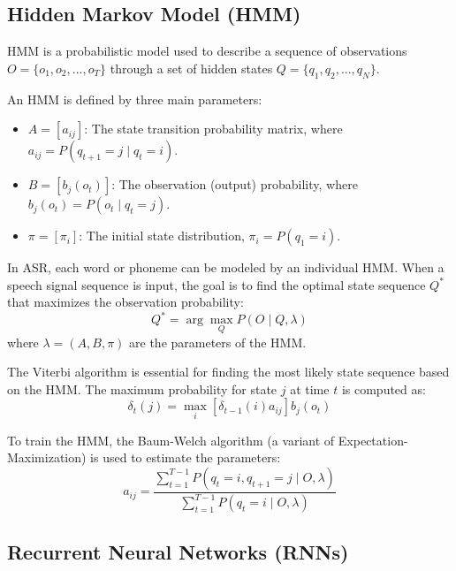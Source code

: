\documentclass[conference]{IEEEtran}
\begin{document}
\subsection{Hidden Markov Model (HMM)}
HMM is a probabilistic model used to describe a sequence of observations $O = \{o_1, o_2, ..., o_T\}$ through a set of hidden states $Q = \{q_1, q_2, ..., q_N\}$.

An HMM is defined by three main parameters:
\begin{itemize}
    \item $A = [a_{ij}]$: The state transition probability matrix, where $a_{ij} = P(q_{t+1} = j \mid q_t = i)$.
    \item $B = [b_j(o_t)]$: The observation (output) probability, where $b_j(o_t) = P(o_t \mid q_t = j)$.
    \item $\pi = [\pi_i]$: The initial state distribution, $\pi_i = P(q_1 = i)$.
\end{itemize}

In ASR, each word or phoneme can be modeled by an individual HMM. When a speech signal sequence is input, the goal is to find the optimal state sequence $Q^*$ that maximizes the observation probability:
\begin{equation}
    Q^* = \arg\max_Q P(O \mid Q, \lambda)
\end{equation}
where $\lambda = (A, B, \pi)$ are the parameters of the HMM.

The Viterbi algorithm is essential for finding the most likely state sequence based on the HMM. The maximum probability for state $j$ at time $t$ is computed as:
\begin{equation}
    \delta_t(j) = \max_i \left[ \delta_{t-1}(i) a_{ij} \right] b_j(o_t)
\end{equation}

To train the HMM, the Baum-Welch algorithm (a variant of Expectation-Maximization) is used to estimate the parameters:
\begin{equation}
    a_{ij} = \frac{\sum_{t=1}^{T-1} P(q_t = i, q_{t+1} = j \mid O, \lambda)}{\sum_{t=1}^{T-1} P(q_t = i \mid O, \lambda)}
\end{equation}









\subsection{Recurrent Neural Networks (RNNs)}
\end{document}
